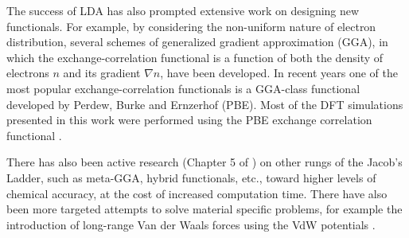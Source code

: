 The success of LDA has also prompted extensive work on designing new functionals. For
example, by considering the non-uniform nature of electron distribution, several
schemes of generalized gradient approximation (GGA), in which the
exchange-correlation functional is a function of both the density of electrons $n$
and its gradient $\nabla n$, have been developed. In recent years one of the most
popular exchange-correlation functionals is a GGA-class functional developed by
Perdew, Burke and Ernzerhof \citep{Perdew1996} (PBE). Most of the DFT simulations
presented in this work were performed using the PBE exchange correlation functional .

There has also been active research (Chapter 5 of \cite{martin-esbook}) on other
rungs of the Jacob's Ladder, such as meta-GGA, hybrid functionals, etc., toward
higher levels of chemical accuracy, at the cost of increased computation time. There
have also been more targeted attempts to solve material specific problems, for
example the introduction of long-range Van der Waals forces using the VdW potentials
\citep{Raymond2015}.


